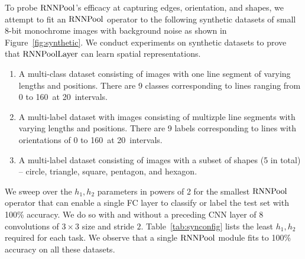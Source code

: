 \documentclass[10pt]{article}
\newcommand{\rpool}{\ensuremath{{\rm RNNPool}}\xspace}
\newcommand{\rpoollayer}{\ensuremath{{\rm RNNPoolLayer}}\xspace}
\begin{document}
To probe \rpool's efficacy at capturing edges, orientation, and
shapes, we attempt to fit an \rpool operator to the following
synthetic datasets of small 8-bit monochrome images with background
noise as shown in Figure~\ref{fig:synthetic}.  We conduct experiments
on synthetic datasets to prove that \rpoollayer can learn spatial
representations. 
\begin{enumerate}[leftmargin=*]
  \item A multi-class dataset consisting of images with one line
    segment of varying lengths and positions. There are 9 classes
    corresponding to lines ranging from 0 to 160\textdegree~at
    20\textdegree~intervals.
  \item A multi-label dataset with images consisting of multizple line
    segments with varying lengths and positions. There are 9 labels
    corresponding to lines with orientations of 0 to 160\textdegree~at
    20\textdegree~intervals.
  \item A multi-label dataset consisting of images with a subset of
    shapes (5 in total) -- circle, triangle, square, pentagon, and
    hexagon.
\end{enumerate}


\begin{wraptable}{r}{0.5\columnwidth}
\vspace{-5mm}
\centering
    \caption{\small Minimum required hyperparameter configurations for synthetic experiments.}
\label{tab:synconfig}
\vspace{-3mm}
\end{wraptable}  We sweep over the $h_1, h_2$
parameters in powers of 2 for the smallest \rpool operator that can
enable a single FC layer to classify or label the test set with 100\%
accuracy. We do so with and without a preceding CNN layer of $8$
convolutions of $3\times 3$ size and stride
$2$. Table~\ref{tab:synconfig} lists the least $h_1, h_2$ required for
each task.  We observe that a single \rpool module fits to 100\%
accuracy on all these datasets.
\end{document}
